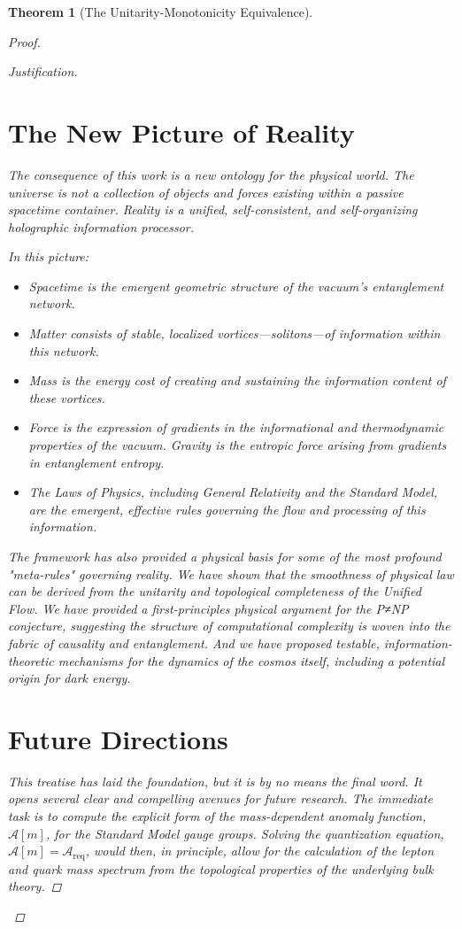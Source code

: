 \documentclass[11pt, letterpaper]{report}
\theoremstyle{plain} %
\newtheorem{theorem}{Theorem}[chapter]
\theoremstyle{definition} %
\theoremstyle{remark} %
\begin{document}
\begin{theorem}[The Unitarity-Monotonicity Equivalence]
\begin{proof}
\begin{proof}[Justification]
\section{The New Picture of Reality}

The consequence of this work is a new ontology for the physical world. The universe is not a collection of objects and forces existing within a passive spacetime container. Reality is a unified, self-consistent, and self-organizing holographic information processor.

In this picture:
\begin{itemize}
    \item Spacetime is the emergent geometric structure of the vacuum's entanglement network.
    \item Matter consists of stable, localized vortices—solitons—of information within this network.
    \item Mass is the energy cost of creating and sustaining the information content of these vortices.
    \item Force is the expression of gradients in the informational and thermodynamic properties of the vacuum. Gravity is the entropic force arising from gradients in entanglement entropy.
    \item The Laws of Physics, including General Relativity and the Standard Model, are the emergent, effective rules governing the flow and processing of this information.
\end{itemize}
The framework has also provided a physical basis for some of the most profound "meta-rules" governing reality. We have shown that the smoothness of physical law can be derived from the unitarity and topological completeness of the Unified Flow. We have provided a first-principles physical argument for the P≠NP conjecture, suggesting the structure of computational complexity is woven into the fabric of causality and entanglement. And we have proposed testable, information-theoretic mechanisms for the dynamics of the cosmos itself, including a potential origin for dark energy.

\section{Future Directions}

This treatise has laid the foundation, but it is by no means the final word. It opens several clear and compelling avenues for future research. The immediate task is to compute the explicit form of the mass-dependent anomaly function, $\mathcal{A}[m]$, for the Standard Model gauge groups. Solving the quantization equation, $\mathcal{A}[m] = \mathcal{A}_{\text{req}}$, would then, in principle, allow for the calculation of the lepton and quark mass spectrum from the topological properties of the underlying bulk theory.


\end{proof}
\end{proof}
\end{theorem}
\end{document}
